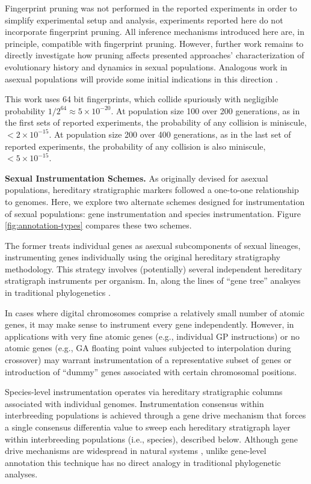 Fingerprint pruning was not performed in the reported experiments in order to simplify experimental setup and analysis, experiments reported here do not incorporate fingerprint pruning.
All inference mechanisms introduced here are, in principle, compatible with fingerprint pruning.
However, further work remains to directly investigate how pruning affects presented approaches' characterization of evolutionary history and dynamics in sexual populations.
Analogous work in asexual populations will provide some initial indications in this direction \citep{moreno2023toward}.

This work uses 64 bit fingerprints, which collide spuriously with negligible probability $1/2^{64} \approx 5 \times 10^{-20}$.
At population size 100 over 200 generations, as in the first sets of reported experiments, the probability of any collision is miniscule, $< 2 \times 10^{-15}$.
At population size 200 over 400 generations, as in the last set of reported experiments, the probability of any collision is also miniscule, $< 5 \times 10^{-15}$.


\textbf{Sexual Instrumentation Schemes.}
As originally devised for asexual populations, hereditary stratigraphic markers followed a one-to-one relationship to genomes.
Here, we explore two alternate schemes designed for instrumentation of sexual populations: gene instrumentation and species instrumentation.
Figure \ref{fig:annotation-types} compares these two schemes.

The former treats individual genes as asexual subcomponents of sexual lineages, instrumenting genes individually using the original hereditary stratigraphy methodology.
This strategy involves (potentially) several independent hereditary stratigraph instruments per organism.
In, along the lines of ``gene tree'' analsyes in traditional phylogenetics \citep{avise1989gene}.

In cases where digital chromosomes comprise a relatively small number of atomic genes, it may make sense to instrument every gene independently.
However, in applications with very fine atomic genes (e.g., individual GP instructions) or no atomic genes (e.g., GA floating point values subjected to interpolation during crossover) may warrant instrumentation of a representative subset of genes or introduction of ``dummy'' genes associated with certain chromosomal positions.

Species-level instrumentation operates via hereditary stratigraphic columns associated with individual genomes.
Instrumentation consensus within interbreeding populations is achieved through a gene drive mechanism that forces a single consensus differentia value to sweep each hereditary stratigraph layer within interbreeding populations (i.e., species), described below.
Although gene drive mechanisms are widespread in natural systems \citep{alphey2020standardizing, price2020resistance}, unlike gene-level annotation this technique has no direct analogy in traditional phylogenetic analyses.

